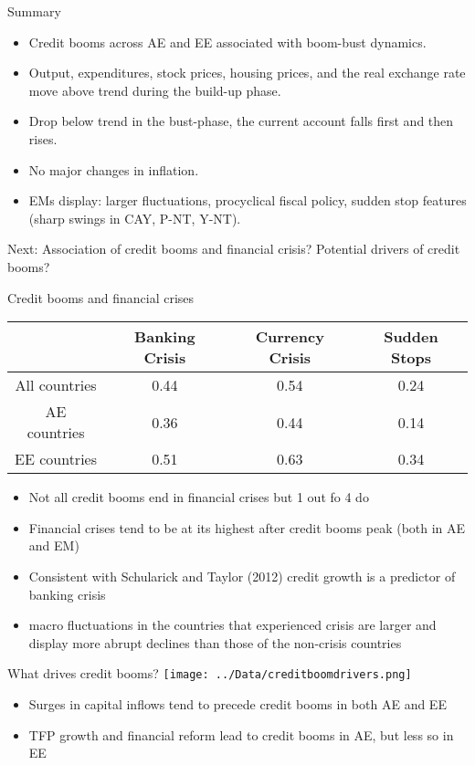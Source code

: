 \documentclass{beamer}
\begin{document}
\begin{frame}{Summary}

\begin{itemize}
\item Credit booms across AE and EE associated with boom-bust dynamics.
\item Output, expenditures, stock prices, housing prices, and the real exchange rate move above trend during the build-up phase.
\item Drop below trend in the bust-phase, the current account falls first and then rises.
\item No major changes in inflation.
\item EMs display: larger fluctuations,  procyclical fiscal policy, sudden stop features (sharp swings in CAY, P-NT, Y-NT).
\end{itemize}

Next: Association of credit booms and financial crisis? Potential drivers of credit booms? 
\end{frame}


\begin{frame}{Credit booms and financial crises}


\begin{table}
\begin{tabular}{cccc}
& Banking Crisis & Currency Crisis & Sudden Stops \\ \hline
All countries & 0.44 & 0.54 & 0.24 \\
AE countries & 0.36 & 0.44 & 0.14 \\
EE countries & 0.51 & 0.63 & 0.34 \\ \hline
\end{tabular}
\end{table}
\begin{itemize}
\item Not all credit booms end in financial crises but 1 out fo 4 do
\item Financial crises tend to be at its highest after credit booms peak (both in AE and EM)
\item Consistent with Schularick and Taylor (2012) credit growth is a predictor of banking crisis 
\item macro fluctuations in the countries that experienced crisis
are larger and display more abrupt declines than those of the non-crisis countries
\end{itemize}
\end{frame}


\begin{frame}{What drives credit booms?}
\centering
\texttt{[image: ../Data/creditboomdrivers.png]}
\begin{itemize}
\vspace*{-0.25cm}
\item Surges in capital inflows tend to precede credit booms
in both AE and EE
\item TFP growth and financial reform lead to credit booms in AE, but less so in EE
\end{itemize}
\end{frame}
\end{document}
